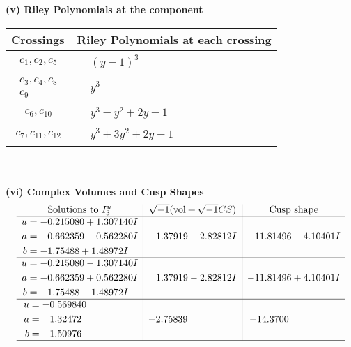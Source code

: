 \documentclass[1p]{elsarticle_modified}
\theoremstyle{definition}
\newcommand{\I}{\sqrt{-1}}
\begin{document}
\newpage\renewcommand{\arraystretch}{1}
\flushleft \textbf{(v) Riley Polynomials at the component}\newline \\
\begin{tabular}{m{50pt}|m{274pt}}
Crossings & \hspace{64pt}Riley Polynomials at each crossing \\
\hline $$\begin{aligned}c_{1},c_{2},c_{5}\end{aligned}$$&$\begin{aligned}
&(y-1)^3
\end{aligned}$\\
\hline $$\begin{aligned}c_{3},c_{4},c_{8}\\c_{9}\end{aligned}$$&$\begin{aligned}
&y^3
\end{aligned}$\\
\hline $$\begin{aligned}c_{6},c_{10}\end{aligned}$$&$\begin{aligned}
&y^3- y^2+2 y-1
\end{aligned}$\\
\hline $$\begin{aligned}c_{7},c_{11},c_{12}\end{aligned}$$&$\begin{aligned}
&y^3+3 y^2+2 y-1
\end{aligned}$\\
\hline
\end{tabular}\\~\\
\newpage\flushleft \textbf{(vi) Complex Volumes and Cusp Shapes}
$$\begin{array}{c|c|c}  
\text{Solutions to }I^u_{3}& \I (\text{vol} + \sqrt{-1}CS) & \text{Cusp shape}\\
 \hline 
\begin{aligned}
u &= -0.215080 + 1.307140 I \\
a &= -0.662359 - 0.562280 I \\
b &= -1.75488 + 1.48972 I\end{aligned}
 & \phantom{-}1.37919 + 2.82812 I & -11.81496 - 4.10401 I \\ \hline\begin{aligned}
u &= -0.215080 - 1.307140 I \\
a &= -0.662359 + 0.562280 I \\
b &= -1.75488 - 1.48972 I\end{aligned}
 & \phantom{-}1.37919 - 2.82812 I & -11.81496 + 4.10401 I \\ \hline\begin{aligned}
u &= -0.569840\phantom{ +0.000000I} \\
a &= \phantom{-}1.32472\phantom{ +0.000000I} \\
b &= \phantom{-}1.50976\phantom{ +0.000000I}\end{aligned}
 & -2.75839\phantom{ +0.000000I} & -14.3700\phantom{ +0.000000I}\\
 \hline 
 \end{array}$$\newpage
\end{document}
